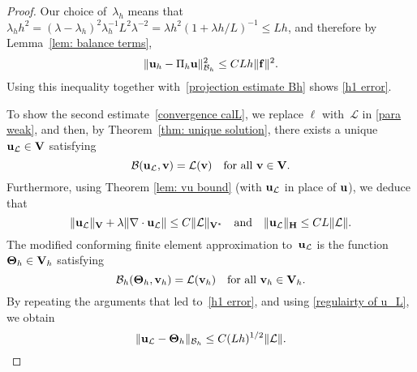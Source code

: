 \documentclass[11pt]{article}
\newcommand{\calB}{\mathcal{B}}
\newcommand{\calL}{\mathcal{L}}
\newcommand{\vf}{{\bf f}}
\newcommand{\vu}{{\bf u}}
\newcommand{\vv}{{\bf v}}
\newcommand{\vV}{{\bf V}}
\numberwithin{equation}{section}
\begin{document}
\begin{proof} 
Our choice of~$\lambda_h$ means that
$\lambda_h h^2=(\lambda-\lambda_h)^2\lambda_h^{-1}L^2\lambda^{-2}
    =\lambda h^2(1+\lambda h/L)^{-1}\le Lh$, and therefore by
Lemma~\ref{lem: balance terms},
\begin{equation}\label{eq: uh Pih u}
\|\vu_h-\Pi_h \vu\|_{\calB_h}^2 \le CLh\|\vf\|^2.
\end{equation}
Using this inequality together with~\eqref{projection estimate Bh} shows
\eqref{h1 error}.

To show the second estimate~\eqref{convergence calL}, we replace $\ell$
with~$\calL$ in \eqref{para weak}, and then, by
Theorem~\ref{thm: unique solution}, there exists a unique~$\vu_{\calL} \in \vV$ satisfying
\begin{equation}\label{weak form uL}
\calB(\vu_{\calL}, \vv) = \calL(\vv)\quad\text{for all $\vv \in \vV$.}
\end{equation}
Furthermore, using  Theorem \ref{lem: vu bound} (with $\vu_{\calL}$ in place of $\vu$), we deduce that  
\begin{equation}\label{regulairty of u_L}
    \|\vu_{\calL}\|_{\vV}+\lambda\|\nabla\cdot \vu_{\calL}\| \le C\|\calL\|_{\vV^*}\quad{\rm and}\quad 
\|\vu_{\calL}\|_{\bf H}\le CL\|\calL\|.
\end{equation}
The modified conforming finite element approximation to~$\vu_{\calL}$ is the
function~$\mathbf{\Theta}_h\in\vV_h$ satisfying
\begin{equation}\label{weak form uL discrete}
\calB_h(\mathbf{\Theta}_h,\vv_h) = \calL(\vv_h)
\quad\text{for all $\vv_h \in\vV_h$.}
\end{equation}
By repeating the arguments that led to~\eqref{h1 error}, and using
\eqref{regulairty of u_L}, we obtain
\begin{equation}\label{projection estimate ucalL}
\|\vu_{\calL}-\mathbf{\Theta}_h\|_{\calB_h}\le C(Lh)^{1/2}\|\calL\|.
\end{equation}


\end{proof}
\end{document}
